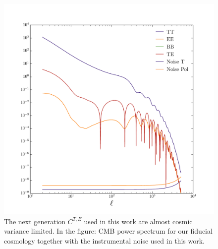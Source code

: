\documentclass[aps,prd,reprint,superscriptaddress]{revtex4-1}
\begin{document}
\begin{figure}[htbp]
\begin{center}
\includegraphics[scale=0.4]{PS_with_noise.pdf}
\caption{The next generation $C^{T,E}$ used in this work are almost cosmic variance limited.
In the figure: CMB power spectrum for our fiducial cosmology together with the instrumental noise used in this work.}
\label{fig:cmb-cl-noise}
\end{center}
\end{figure}
\end{document}
